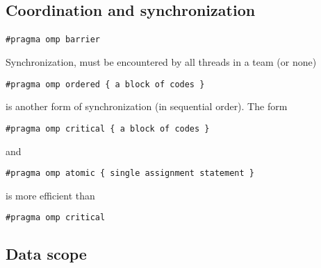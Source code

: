 \documentclass[%
oneside,                 %
final,                   %
10pt]{article}
\begin{document}
\subsection*{Coordination and synchronization}

\paragraph{}


\begin{verbatim}
#pragma omp barrier

\end{verbatim}

Synchronization, must be encountered by all threads in a team (or none)


\begin{verbatim}
#pragma omp ordered { a block of codes }

\end{verbatim}

is another form of synchronization (in sequential order).
The form


\begin{verbatim}
#pragma omp critical { a block of codes }

\end{verbatim}

and 


\begin{verbatim}
#pragma omp atomic { single assignment statement }

\end{verbatim}

is  more efficient than 


\begin{verbatim}
#pragma omp critical

\end{verbatim}



\subsection*{Data scope}
\end{document}
